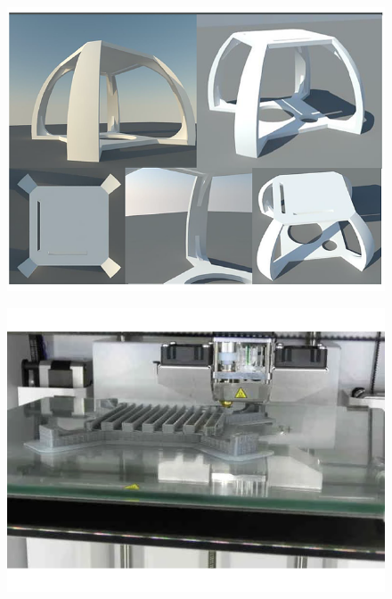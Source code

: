                 \begin{figure}[!h]
                \begin{minipage}{0.315\linewidth}
                    \centering
                    \includegraphics[width=\linewidth]{Figures/CC-socle_num.png}
                    \label{fig:socle_num}
                \end{minipage}
                \hfill
                \begin{minipage}{0.31\linewidth}
                    \centering
                    \includegraphics[width=\linewidth]{Figures/CC-socle_print.png}
                    \label{fig:socle_print}
                \end{minipage}

\end{figure}
